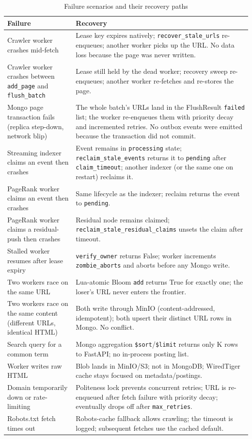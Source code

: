 \documentclass[11pt,a4paper]{article}
\newcommand{\code}[1]{\texttt{#1}}
\begin{document}
\begin{table}[H]
\centering
\caption{Failure scenarios and their recovery paths}
\small
\begin{tabular}{p{}p{}}
\toprule
Failure & Recovery \\
\midrule
Crawler worker crashes mid-fetch & Lease key expires natively; \code{recover\_stale\_urls} re-enqueues; another worker picks up the URL. No data loss because the page was never written.\\
Crawler worker crashes between \code{add\_page} and \code{flush\_batch} & Lease still held by the dead worker; recovery sweep re-enqueues; another worker re-fetches and re-stores the page.\\
Mongo page transaction fails (replica step-down, network blip) & The whole batch's URLs land in the FlushResult \code{failed} list; the worker re-enqueues them with priority decay and incremented retries. No outbox events were emitted because the transaction did not commit.\\
Streaming indexer claims an event then crashes & Event remains in \code{processing} state; \code{reclaim\_stale\_events} returns it to \code{pending} after \code{claim\_timeout}; another indexer (or the same one on restart) reclaims it.\\
PageRank worker claims an event then crashes & Same lifecycle as the indexer; reclaim returns the event to \code{pending}.\\
PageRank worker claims a residual-push then crashes & Residual node remains claimed; \code{reclaim\_stale\_residual\_claims} unsets the claim after timeout.\\
Stalled worker resumes after lease expiry & \code{verify\_owner} returns False; worker increments \code{zombie\_aborts} and aborts before any Mongo write.\\
Two workers race on the same URL & Lua-atomic Bloom \code{add} returns True for exactly one; the loser's URL never enters the frontier.\\
Two workers race on the same content (different URLs, identical HTML) & Both write through MinIO (content-addressed, idempotent); both upsert their distinct URL rows in Mongo. No conflict.\\
Search query for a common term & Mongo aggregation \code{\$sort}/\code{\$limit} returns only K rows to FastAPI; no in-process posting list.\\
Worker writes raw HTML & Blob lands in MinIO/S3; not in MongoDB; WiredTiger cache stays focused on metadata/postings.\\
Domain temporarily down or rate-limiting & Politeness lock prevents concurrent retries; URL is re-enqueued after fetch failure with priority decay; eventually drops off after \code{max\_retries}.\\
Robots.txt fetch times out & Robots-cache fallback allows crawling; the timeout is logged; subsequent fetches use the cached default.\\
\bottomrule
\end{tabular}
\normalsize
\end{table}
\end{document}

